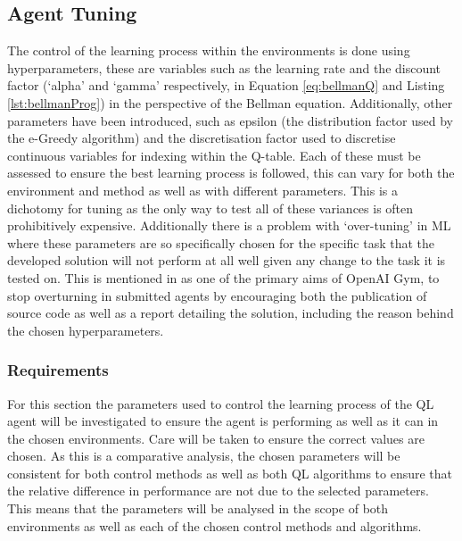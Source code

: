 \documentclass[hidelinks,journal]{IEEEtran}
\begin{document}
\subsection{Agent Tuning}
\label{subsec:desAgentTuning}
The control of the learning process within the environments is done using hyperparameters, these are variables such as the learning rate and the discount factor (‘alpha’ and ‘gamma’ respectively, in Equation \ref{eq:bellmanQ} and Listing \ref{lst:bellmanProg}) in the perspective of the Bellman equation. Additionally, other parameters have been introduced, such as epsilon (the distribution factor used by the e-Greedy algorithm) and the discretisation factor used to discretise continuous variables for indexing within the Q-table. Each of these must be assessed to ensure the best learning process is followed, this can vary for both the environment and method as well as with different parameters. This is a dichotomy for tuning as the only way to test all of these variances is often prohibitively expensive. Additionally there is a problem with ‘over-tuning’ in ML where these parameters are so specifically chosen for the specific task that the developed solution will not perform at all well given any change to the task it is tested on. This is mentioned in \textcite{Brockman16} as one of the primary aims of OpenAI Gym, to stop overturning in submitted agents by encouraging both the publication of source code as well as a report detailing the solution, including the reason behind the chosen hyperparameters.
\subsubsection{Requirements}
\label{subsubsec:desAgentTuningReq}
For this section the parameters used to control the learning process of the QL agent will be investigated to ensure the agent is performing as well as it can in the chosen environments. Care will be taken to ensure the correct values are chosen. As this is a comparative analysis, the chosen parameters will be consistent for both control methods as well as both QL algorithms to ensure that the relative difference in performance are not due to the selected parameters. This means that the parameters will be analysed in the scope of both environments as well as each of the chosen control methods and algorithms.
\end{document}
